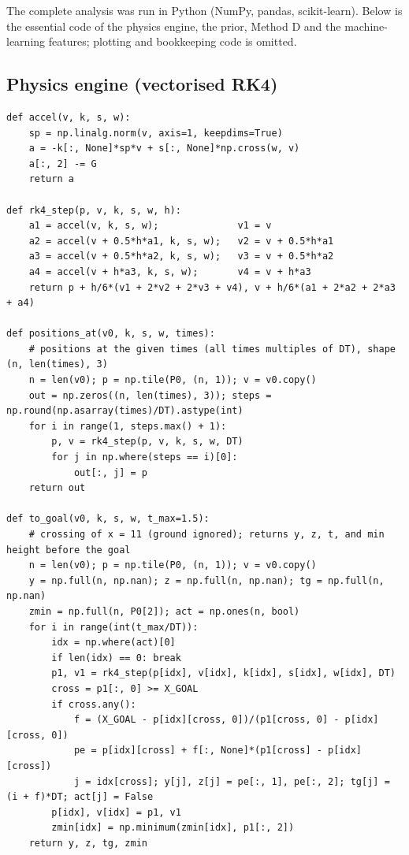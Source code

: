 The complete analysis was run in Python (NumPy, pandas, scikit-learn). Below is the essential code of the physics engine, the prior, Method D and the machine-learning features; plotting and bookkeeping code is omitted.


\subsection*{Physics engine (vectorised RK4)}
\begin{lstlisting}[style=mypython,basicstyle=\ttfamily\scriptsize]
def accel(v, k, s, w):
    sp = np.linalg.norm(v, axis=1, keepdims=True)
    a = -k[:, None]*sp*v + s[:, None]*np.cross(w, v)
    a[:, 2] -= G
    return a

def rk4_step(p, v, k, s, w, h):
    a1 = accel(v, k, s, w);              v1 = v
    a2 = accel(v + 0.5*h*a1, k, s, w);   v2 = v + 0.5*h*a1
    a3 = accel(v + 0.5*h*a2, k, s, w);   v3 = v + 0.5*h*a2
    a4 = accel(v + h*a3, k, s, w);       v4 = v + h*a3
    return p + h/6*(v1 + 2*v2 + 2*v3 + v4), v + h/6*(a1 + 2*a2 + 2*a3 + a4)

def positions_at(v0, k, s, w, times):
    # positions at the given times (all times multiples of DT), shape (n, len(times), 3)
    n = len(v0); p = np.tile(P0, (n, 1)); v = v0.copy()
    out = np.zeros((n, len(times), 3)); steps = np.round(np.asarray(times)/DT).astype(int)
    for i in range(1, steps.max() + 1):
        p, v = rk4_step(p, v, k, s, w, DT)
        for j in np.where(steps == i)[0]:
            out[:, j] = p
    return out

def to_goal(v0, k, s, w, t_max=1.5):
    # crossing of x = 11 (ground ignored); returns y, z, t, and min height before the goal
    n = len(v0); p = np.tile(P0, (n, 1)); v = v0.copy()
    y = np.full(n, np.nan); z = np.full(n, np.nan); tg = np.full(n, np.nan)
    zmin = np.full(n, P0[2]); act = np.ones(n, bool)
    for i in range(int(t_max/DT)):
        idx = np.where(act)[0]
        if len(idx) == 0: break
        p1, v1 = rk4_step(p[idx], v[idx], k[idx], s[idx], w[idx], DT)
        cross = p1[:, 0] >= X_GOAL
        if cross.any():
            f = (X_GOAL - p[idx][cross, 0])/(p1[cross, 0] - p[idx][cross, 0])
            pe = p[idx][cross] + f[:, None]*(p1[cross] - p[idx][cross])
            j = idx[cross]; y[j], z[j] = pe[:, 1], pe[:, 2]; tg[j] = (i + f)*DT; act[j] = False
        p[idx], v[idx] = p1, v1
        zmin[idx] = np.minimum(zmin[idx], p1[:, 2])
    return y, z, tg, zmin
\end{lstlisting}
